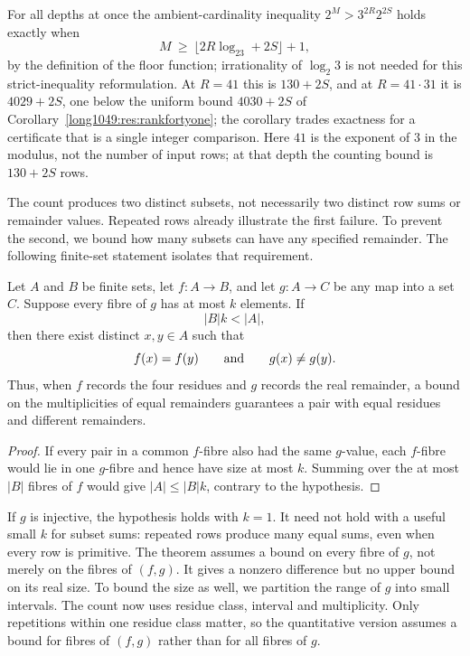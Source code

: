 For all depths at once the ambient-cardinality inequality $2^{M}>3^{2R}2^{2S}$
holds exactly when
\[
 M\ \ge\ \bigl\lfloor2R\log_23+2S\bigr\rfloor+1,
\]
by the definition of the floor function; irrationality of $\log_2 3$
is not needed for this strict-inequality reformulation.
At $R=41$ this is $130+2S$, and
at $R=41\cdot31$ it is $4029+2S$, one below the uniform bound $4030+2S$ of
Corollary~\ref{long1049:res:rankfortyone}; the corollary trades exactness for a
certificate that is a single integer comparison.  Here $41$ is the exponent of $3$ in the modulus, not the number of
input rows; at that depth the counting bound is $130+2S$ rows.

The count produces two distinct subsets, not necessarily two
distinct row sums or remainder values. Repeated rows already
illustrate the first failure. To prevent the second, we bound how
many subsets can have any specified remainder. The following
finite-set statement isolates that requirement.

\begin{theorem}\label{long1049:res:boundedfibre}
Let $A$ and $B$ be finite sets, let $f:A\to B$, and let $g:A\to C$ be any
map into a set $C$.  Suppose every fibre of $g$ has at most $k$ elements.  If
\[
 |B|k<|A|,
\]
then there exist distinct $x,y\in A$ such that
\[
 f(x)=f(y)\qquad\hbox{and}\qquad g(x)\ne g(y).
\]
Thus, when $f$ records the four residues and $g$ records the real
remainder, a bound on the multiplicities of equal remainders guarantees
a pair with equal residues and different remainders.
\end{theorem}

\begin{proof}
If every pair in a common $f$-fibre also had the same $g$-value, each
$f$-fibre would lie in one $g$-fibre and hence have size at most $k$.
Summing over the at most $|B|$ fibres of $f$ would give
$|A|\le |B|k$, contrary to the hypothesis.
\end{proof}

If $g$ is injective, the hypothesis holds with $k=1$. It need not hold
with a useful small $k$ for subset sums: repeated rows produce
many equal sums, even when every row is primitive. The theorem assumes
a bound on every fibre of $g$, not merely on the fibres of $(f,g)$.
It gives a nonzero difference but no upper bound on its real size.
To bound the size as well, we partition the range of $g$ into small
intervals. The count now uses residue class, interval and multiplicity.
Only repetitions within one residue class matter, so the quantitative
version assumes a bound for fibres of $(f,g)$ rather than for all
fibres of $g$.

